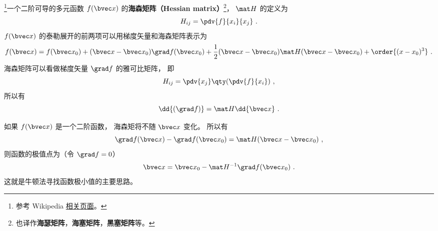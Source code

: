 
\begin{issues}
\issueDraft
\end{issues}


\footnote{参考 Wikipedia \href{https://en.wikipedia.org/wiki/Hessian_matrix}{相关页面}。}一个二阶可导的多元函数 $f(\bvec x)$ 的\textbf{海森矩阵（Hessian matrix）}\footnote{也译作\textbf{海瑟矩阵}，\textbf{海塞矩阵}，\textbf{黑塞矩阵}等。}， $\mat H$ 的定义为
\begin{equation}
H_{ij} = \pdv{f}{x_i}{x_j}~.
\end{equation}
$f(\bvec x)$ 的泰勒展开的前两项可以用梯度矢量和海森矩阵表示为
\begin{equation}
f(\bvec x) = f(\bvec x_0) + (\bvec x - \bvec x_0) \grad f(\bvec x_0) + \frac12(\bvec x - \bvec x_0) \mat H (\bvec x - \bvec x_0) + \order{(x-x_0)^3}~.
\end{equation}
海森矩阵可以看做梯度矢量 $\grad f$ 的雅可比矩阵， 即
\begin{equation}
H_{ij} = \pdv{x_j} \qty(\pdv{f}{x_i})~,
\end{equation}
所以有
\begin{equation}
\dd{(\grad f)} = \mat H \dd{\bvec x}~.
\end{equation}

如果 $f(\bvec x)$ 是一个二阶函数， 海森矩将不随 $\bvec x$ 变化。 所以有
\begin{equation}
\grad f(\bvec x) - \grad f(\bvec x_0) = \mat H (\bvec x - \bvec x_0)~,
\end{equation}
则函数的极值点为（令 $\grad f = 0$）
\begin{equation}
\bvec x = \bvec x_0 - \mat H^{-1} \grad f(\bvec x_0)~.
\end{equation}
这就是牛顿法寻找函数极小值的主要思路。%
